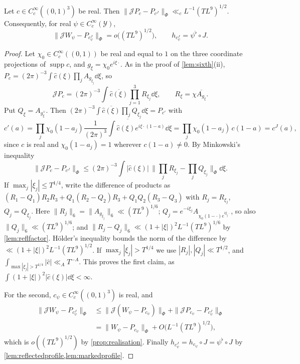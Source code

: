 \documentclass[11pt,colorlinks]{charlie}
\begin{document}
\begin{lemma}\label{lem:reflcube}
Let $c\in C_c^\infty((0,1)^3)$ be real. Then $\|\mathcal JP_c-P_{c^J}\|_\Phi\ll_cL^{-1}(TL^9)^{1/2}$. Consequently, for real $\psi\in C_c^\infty(\mathcal Y)$,
\[
 \|\mathcal JW_\psi-P_{c_\psi^J}\|_\Phi=o\big((TL^9)^{1/2}\big),\qquad h_{c_\psi^J}=\psi^\flat\circ J .
\]
\end{lemma}
\begin{proof}
Let $\chi_0\in C_c^\infty((0,1))$ be real and equal to $1$ on the three coordinate projections of $\operatorname{supp}c$, and $g_\xi=\chi_0e^{i\xi\cdot}$. As in the proof of \cref{lem:sixth}(ii), $P_c=(2\pi)^{-3}\int\widehat c(\xi)\prod_jA_{g_{\xi_j}}\dd\xi$, so
\[
 \mathcal JP_c=(2\pi)^{-3}\int\overline{\widehat c(\xi)}\prod_{j=1}^3R_{\xi_j}\dd\xi,\qquad R_\xi=\chi\overline{A_{g_\xi}} .
\]
Put $Q_\xi=A_{g_\xi^\vee}$. Then $(2\pi)^{-3}\int\overline{\widehat c(\xi)}\prod_jQ_{\xi_j}\dd\xi=P_{c'}$ with
\[
 c'(a)=\prod_j\chi_0(1-a_j)\overline{\frac1{(2\pi)^3}\int\widehat c(\xi)e^{i\xi\cdot(1-a)}\dd\xi}=\prod_j\chi_0(1-a_j)\,c(1-a)=c^J(a),
\]
since $c$ is real and $\chi_0(1-a_j)=1$ wherever $c(1-a)\ne0$. By Minkowski's inequality
\[
 \|\mathcal JP_c-P_{c^J}\|_\Phi\le(2\pi)^{-3}\int|\widehat c(\xi)|\,\Big\|\prod_jR_{\xi_j}-\prod_jQ_{\xi_j}\Big\|_\Phi\dd\xi .
\]
If $\max_j|\xi_j|\le T^{1/4}$, write the difference of products as $(R_1-Q_1)R_2R_3+Q_1(R_2-Q_2)R_3+Q_1Q_2(R_3-Q_3)$ with $R_j=R_{\xi_j}$, $Q_j=Q_{\xi_j}$. Here $\|R_j\|_6=\|A_{g_{\xi_j}}\|_6\ll(TL^9)^{1/6}$; $Q_j=e^{-i\xi_j}A_{\chi_0(1-\cdot)e^{i\xi_j\cdot}}$, so also $\|Q_j\|_6\ll(TL^9)^{1/6}$; and $\|R_j-Q_j\|_6\ll(1+|\xi|)^2L^{-1}(TL^9)^{1/6}$ by \cref{lem:reflfactor}. H\"older's inequality bounds the norm of the difference by $\ll(1+|\xi|)^2L^{-1}(TL^9)^{1/2}$. If $\max_j|\xi_j|>T^{1/4}$ we use $|R_j|,|Q_j|\ll T^{1/2}$, and $\int_{\max|\xi_j|>T^{1/4}}|\widehat c|\ll_AT^{-A}$. This proves the first claim, as $\int(1+|\xi|)^2|\widehat c(\xi)|\dd\xi<\infty$.

For the second, $c_\psi\in C_c^\infty((0,1)^3)$ is real, and
\[
 \begin{split}
 \|\mathcal JW_\psi-P_{c_\psi^J}\|_\Phi&\le\|\mathcal J(W_\psi-P_{c_\psi})\|_\Phi+\|\mathcal JP_{c_\psi}-P_{c_\psi^J}\|_\Phi\\
 &=\|W_\psi-P_{c_\psi}\|_\Phi+O\big(L^{-1}(TL^9)^{1/2}\big),
 \end{split}
\]
which is $o((TL^9)^{1/2})$ by \cref{prop:realisation}. Finally $h_{c_\psi^J}=h_{c_\psi}\circ J=\psi^\flat\circ J$ by \cref{lem:reflectedprofile,lem:markedprofile}.
\end{proof}
\end{document}
